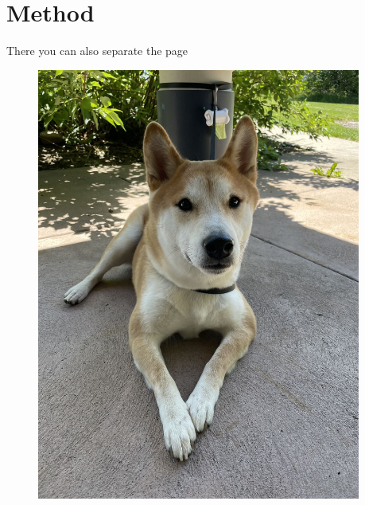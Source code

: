 \documentclass[9pt, xcolor={dvipsnames}]{beamer}
\begin{document}
\section{Method}
\begin{frame}[label=Rocky]{There you can also separate the page}
\begin{figure}
 \begin{columns}[c]
  \begin{column}{0.3\textwidth}
    \centering
    \includegraphics[width=1\textwidth]{Figure2.jpg}
  \end{column}
  \begin{column}{0.3\textwidth}
    \centering

\end{column}
\end{columns}
\end{figure}
\end{frame}
\end{document}
